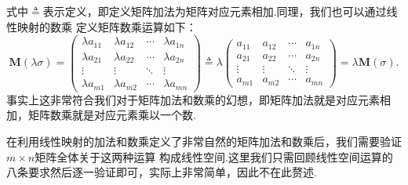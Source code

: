 式中$\triangleq$表示定义，即定义矩阵加法为矩阵对应元素相加.同理，我们也可以通过线性映射的数乘
定义矩阵数乘运算如下：
\[\mathbf{M}(\lambda\sigma)=\begin{pmatrix}
    \lambda a_{11} & \lambda a_{12} & \cdots & \lambda a_{1n} \\
    \lambda a_{21} & \lambda a_{22} & \cdots & \lambda a_{2n} \\
    \vdots & \vdots & \ddots & \vdots \\
    \lambda a_{m1} & \lambda a_{m2} & \cdots & \lambda a_{mn}
\end{pmatrix}\triangleq\lambda\begin{pmatrix}
    a_{11} & a_{12} & \cdots & a_{1n} \\
    a_{21} & a_{22} & \cdots & a_{2n} \\
    \vdots & \vdots & \ddots & \vdots \\
    a_{m1} & a_{m2} & \cdots & a_{mn}
\end{pmatrix}=\lambda\mathbf{M}(\sigma).\]
事实上这非常符合我们对于矩阵加法和数乘的幻想，即矩阵加法就是对应元素相加，矩阵数乘就是对应元素乘以一个数.

在利用线性映射的加法和数乘定义了非常自然的矩阵加法和数乘后，我们需要验证$m\times n$矩阵全体关于这两种运算
构成线性空间.这里我们只需回顾线性空间运算的八条要求然后逐一验证即可，实际上非常简单，因此不在此赘述.

